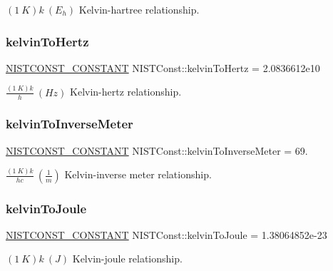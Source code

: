 $(1\ K)k \ (E_h)$ Kelvin-\/hartree relationship. \mbox{\label{group___n_i_s_t_const-_kelvin_ga3fc1294bab1527265c87fd2df49d568c}} 
\subsubsection{\texorpdfstring{kelvin\+To\+Hertz}{kelvinToHertz}}
{\footnotesize\ttfamily \mbox{\hyperlink{_n_i_s_t_const_8hpp_a2b0fc1d7452373f816175dd86ce26729}{N\+I\+S\+T\+C\+O\+N\+S\+T\+\_\+\+C\+O\+N\+S\+T\+A\+NT}} N\+I\+S\+T\+Const\+::kelvin\+To\+Hertz = 2.\+0836612e10}

$\frac{(1\ K)k}{h} \ (Hz)$ Kelvin-\/hertz relationship. \mbox{\label{group___n_i_s_t_const-_kelvin_ga7c76d99ebcba19f9c15c6dc96282576b}} 
\subsubsection{\texorpdfstring{kelvin\+To\+Inverse\+Meter}{kelvinToInverseMeter}}
{\footnotesize\ttfamily \mbox{\hyperlink{_n_i_s_t_const_8hpp_a2b0fc1d7452373f816175dd86ce26729}{N\+I\+S\+T\+C\+O\+N\+S\+T\+\_\+\+C\+O\+N\+S\+T\+A\+NT}} N\+I\+S\+T\+Const\+::kelvin\+To\+Inverse\+Meter = 69.}

$\frac{(1\ K)k}{hc} \ (\frac{1}{m})$ Kelvin-\/inverse meter relationship. \mbox{\label{group___n_i_s_t_const-_kelvin_ga2257299cf7bd7dd841a7325e47a67907}} 
\subsubsection{\texorpdfstring{kelvin\+To\+Joule}{kelvinToJoule}}
{\footnotesize\ttfamily \mbox{\hyperlink{_n_i_s_t_const_8hpp_a2b0fc1d7452373f816175dd86ce26729}{N\+I\+S\+T\+C\+O\+N\+S\+T\+\_\+\+C\+O\+N\+S\+T\+A\+NT}} N\+I\+S\+T\+Const\+::kelvin\+To\+Joule = 1.\+38064852e-\/23}

$(1\ K)k \ (J)$ Kelvin-\/joule relationship. \mbox{\label{group___n_i_s_t_const-_kelvin_gad28887701d9265b5489c4deaabee8deb}} 
